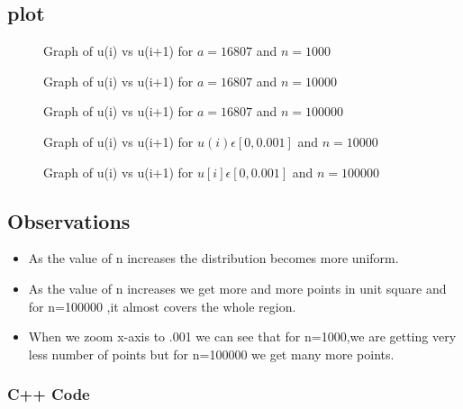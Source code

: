 \documentclass[10pt]{article}
\begin{document}
\subsection{plot}
	\begin{figure}[H]
       	     	\centering
		\caption{Graph of u(i) vs u(i+1) for $ a =16807 $  and $ n = 1000  $}	
		\label{3:q3_f1_a}
	\end{figure}
	\begin{figure}[H]
       	     	\centering
		\caption{Graph of u(i)  vs  u(i+1) for $ a = 16807 $  and   $ n = 10000 $}	
		\label{3:q3_f1_b}
	\end{figure}
	\begin{figure}[H]
       	     	\centering
		\caption{Graph of u(i)  vs  u(i+1) for $ a= 16807   $ and $ n = 100000 $}	
		\label{3:q3_f1_c}
	\end{figure}
	\begin{figure}[H]
       	     	\centering
		\caption{Graph of u(i)  vs  u(i+1) for $  u(i)\epsilon[0,0.001] $  and   $ n = 10000 $}	
		\label{3:q3_f1_a}
	\end{figure}
	\begin{figure}[H]
       	     	\centering
		\caption{Graph of u(i)  vs  u(i+1) for $  u[i]\epsilon[0,0.001] $  and $  n = 100000 $}	
		\label{3:q3_f1_a}
	\end{figure}
\subsection{Observations}
\begin{itemize}
\item As the value of n increases the distribution becomes more uniform.
\item As the value of n increases we get more and more points in unit square and for n=100000 ,it almost covers the whole region.
\item When we zoom x-axis to .001 we can see that for n=1000,we are getting very less number of points but for n=100000 we get many more points. 
\end{itemize}
\subsubsection{C++ Code}

\pagebreak
\end{document}
